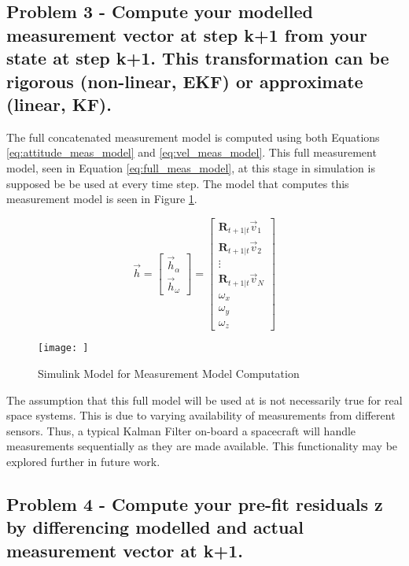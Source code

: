 \subsection{Problem 3 - Compute your modelled measurement vector at step k+1 from your state at step k+1. This transformation can be rigorous (non-linear, EKF) or approximate (linear, KF).}

The full concatenated measurement model is computed using both Equations \ref{eq:attitude_meas_model} and \ref{eq:vel_meas_model}. This full measurement model, seen in Equation \ref{eq:full_meas_model}, at this stage in simulation is supposed be be used at every time step. The model that computes this measurement model is seen in Figure \ref{fig:simulink_meas_model}.

\begin{equation} \label{eq:full_meas_model}
    \vec{h} = \begin{bmatrix}
        \vec{h}_{\alpha} \\ \vec{h}_{\omega}
    \end{bmatrix} = \begin{bmatrix}
        \boldsymbol{R}_{t+1 \vert t} \vec{v}_1 \\
        \boldsymbol{R}_{t+1 \vert t} \vec{v}_2 \\
        \vdots \\
        \boldsymbol{R}_{t+1 \vert t} \vec{v}_N \\
        \omega_x \\
        \omega_y \\
        \omega_z
    \end{bmatrix}
\end{equation}

\begin{figure}[H]
    \centering
    \captionsetup{ justification = centering }
    \texttt{[image: ]}
    \caption{Simulink Model for Measurement Model Computation}
    \label{fig:simulink_meas_model}
\end{figure}

The assumption that this full model will be used at is not necessarily true for real space systems. This is due to varying availability of measurements from different sensors. Thus, a typical Kalman Filter on-board a spacecraft will handle measurements sequentially as they are made available. This functionality may be explored further in future work.

\subsection{Problem 4 - Compute your pre-fit residuals z by differencing modelled and actual measurement vector at k+1.}

